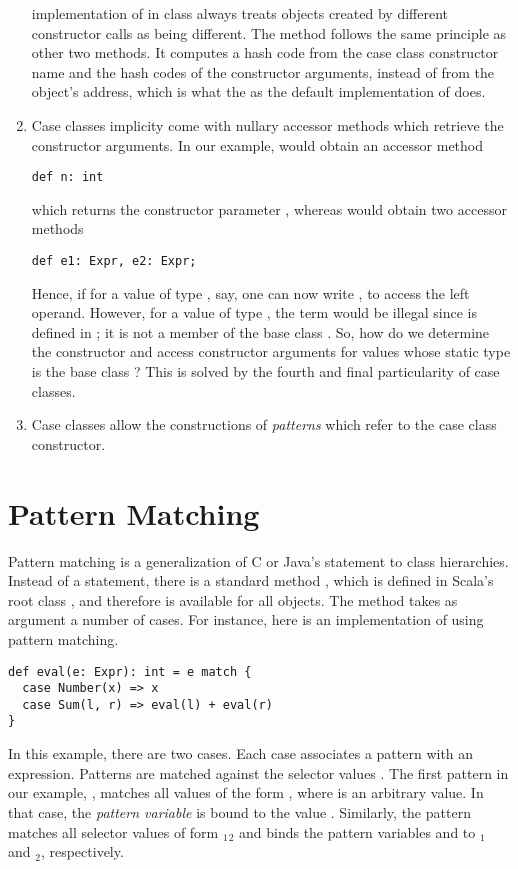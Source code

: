 \documentclass[a4paper,12pt,twoside,titlepage]{book}
\begin{document}
\begin{enumerate}
implementation of  in class  always treats
objects created by different constructor calls as being different.
The  method follows the same principle as other two
methods. It computes a hash code from the case class constructor name
and the hash codes of the constructor arguments, instead of from the object's
address, which is what the as the default implementation of  does.
\item 
Case classes implicity come with nullary accessor methods which
retrieve the constructor arguments.
In our example,  would obtain an accessor method
\begin{lstlisting}
def n: int
\end{lstlisting}
which returns the constructor parameter , whereas  would obtain two accessor methods
\begin{lstlisting}
def e1: Expr, e2: Expr;
\end{lstlisting}
Hence, if for a value  of type , say, one can now
write , to access the left operand. However, for a value
 of type , the term  would be illegal
since  is defined in ; it is not a member of the
base class . 
So, how do we determine the constructor and access constructor
arguments for values whose static type is the base class ?
This is solved by the fourth and final particularity of case classes.
\item 
Case classes allow the constructions of {\em patterns} which refer to
the case class constructor.
\end{enumerate}

\section{Pattern Matching}

Pattern matching is a generalization of C or Java's 
statement to class hierarchies. Instead of a  statement,
there is a standard method , which is defined in Scala's
root class , and therefore is available for all objects.
The  method takes as argument a number of cases. 
For instance, here is an implementation of  using 
pattern matching.
\begin{lstlisting}
def eval(e: Expr): int = e match { 
  case Number(x) => x 
  case Sum(l, r) => eval(l) + eval(r) 
}
\end{lstlisting}
In this example, there are two cases. Each case associates a pattern
with an expression. Patterns are matched against the selector
values .  The first pattern in our example,
, matches all values of the form , 
where  is an arbitrary value.  In that case, the {\em pattern
variable}  is bound to the value . Similarly, the
pattern  matches all selector values of form
$_1$$_2$\code{)} and binds the pattern variables
 and  
to $_1$ and $_2$, respectively. 
\end{document}
